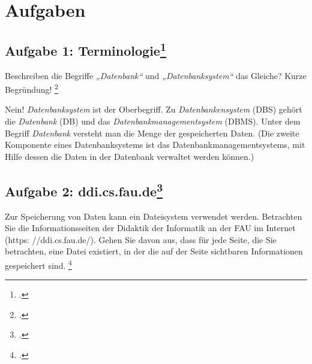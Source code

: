\documentclass{lehramt-informatik-haupt}
\begin{document}

\chapter{Aufgaben}


\section{Aufgabe 1: Terminologie\footcite[Seite 1]{db:ab:1}}

\noindent
Beschreiben die Begriffe \emph{„Datenbank“} und \emph{„Datenbanksystem“}
das Gleiche?
Kurze Begründung!
\footcite[13]{winter}

\begin{antwort}
Nein! \emph{Datenbanksystem} ist der Oberbegriff. Zu
\emph{Datenbankensystem} (DBS) gehört die \emph{Datenbank} (DB) und das
\emph{Datenbankmanagementsystem} (DBMS). Unter dem Begriff
\emph{Datenbank} versteht man die Menge der gespeicherten Daten.
(Die zweite
Komponente eines Datenbanksystems ist das Datenbankmanagementsystems,
mit Hilfe dessen die Daten in der Datenbank verwaltet werden können.)
\end{antwort}


\section{Aufgabe 2: ddi.cs.fau.de\footcite[Seite 1]{db:ab:1}}

Zur Speicherung von Daten kann ein Dateisystem verwendet werden.
Betrachten Sie die Informationsseiten der Didaktik der Informatik an der
FAU im Internet (https: //ddi.cs.fau.de/). Gehen Sie davon aus, dass für
jede Seite, die Sie betrachten, eine Datei existiert, in der die auf der
Seite sichtbaren Informationen gespeichert sind.
\footcite[Seite 19-20]{winter}
\end{document}
